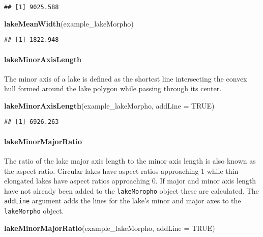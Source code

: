 \documentclass[11pt,]{article}
\newenvironment{Shaded}{\begin{snugshade}}{\end{snugshade}}
\newcommand{\KeywordTok}[1]{\textcolor[rgb]{0.13,0.29,0.53}{\textbf{{#1}}}}
\newcommand{\DataTypeTok}[1]{\textcolor[rgb]{0.13,0.29,0.53}{{#1}}}
\newcommand{\OtherTok}[1]{\textcolor[rgb]{0.56,0.35,0.01}{{#1}}}
\newcommand{\NormalTok}[1]{{#1}}
\begin{document}
\begin{verbatim}
## [1] 9025.588
\end{verbatim}

\begin{Shaded}
\begin{Highlighting}[]
\KeywordTok{lakeMeanWidth}\NormalTok{(example_lakeMorpho)}
\end{Highlighting}
\end{Shaded}

\begin{verbatim}
## [1] 1822.948
\end{verbatim}

\paragraph{lakeMinorAxisLength}\label{lakeminoraxislength}

The minor axis of a lake is defined as the shortest line intersecting
the convex hull formed around the lake polygon while passing through its
center.

\begin{Shaded}
\begin{Highlighting}[]
\KeywordTok{lakeMinorAxisLength}\NormalTok{(example_lakeMorpho, }\DataTypeTok{addLine =} \OtherTok{TRUE}\NormalTok{)}
\end{Highlighting}
\end{Shaded}

\begin{verbatim}
## [1] 6926.263
\end{verbatim}

\paragraph{lakeMinorMajorRatio}\label{lakeminormajorratio}

The ratio of the lake major axis length to the minor axis length is also
known as the aspect ratio. Circular lakes have aspect ratios approaching
1 while thin-elongated lakes have aspect ratios approaching 0. If major
and minor axis length have not already been added to the
\texttt{lakeMoropho} object these are calculated. The \texttt{addLine}
argument adds the lines for the lake's minor and major axes to the
\texttt{lakeMorpho} object.

\begin{Shaded}
\begin{Highlighting}[]
\KeywordTok{lakeMinorMajorRatio}\NormalTok{(example_lakeMorpho, }\DataTypeTok{addLine =} \OtherTok{TRUE}\NormalTok{)}
\end{Highlighting}
\end{Shaded}
\end{document}
